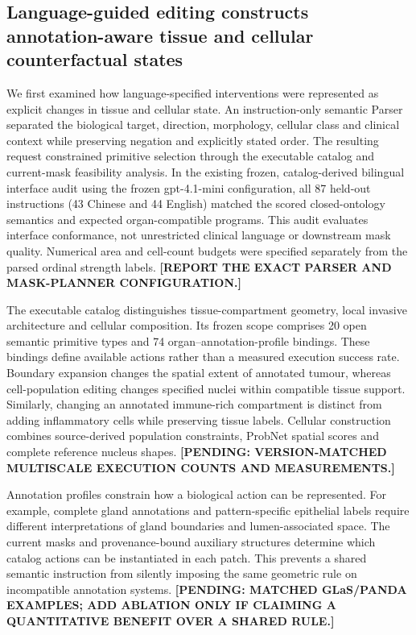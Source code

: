 \subsection{Language-guided editing constructs annotation-aware tissue and cellular counterfactual states}

We first examined how language-specified interventions were represented as
explicit changes in tissue and cellular state. An instruction-only semantic
Parser separated the biological target, direction, morphology, cellular class
and clinical context while preserving negation and explicitly stated order.
The resulting request constrained primitive selection through the executable
catalog and current-mask feasibility analysis. In the existing frozen,
catalog-derived bilingual interface audit using the frozen gpt-4.1-mini
configuration, all 87 held-out instructions
(43 Chinese and 44 English) matched the scored closed-ontology semantics and
expected organ-compatible programs. This audit evaluates interface conformance,
not unrestricted clinical language or downstream mask quality. Numerical area
and cell-count budgets were specified separately from the parsed ordinal
strength labels. \textbf{[REPORT THE EXACT PARSER AND MASK-PLANNER CONFIGURATION.]}

The executable catalog distinguishes tissue-compartment geometry, local
invasive architecture and cellular composition. Its frozen scope comprises
20 open semantic primitive types and 74 organ--annotation-profile bindings.
These bindings define available actions rather than a measured execution
success rate. Boundary expansion changes the spatial extent of annotated tumour,
whereas cell-population editing changes specified nuclei within compatible
tissue support. Similarly, changing an annotated immune-rich compartment is
distinct from adding inflammatory cells while preserving tissue labels.
Cellular construction combines source-derived population constraints,
ProbNet spatial scores and complete reference nucleus shapes.
\textbf{[PENDING: VERSION-MATCHED MULTISCALE EXECUTION COUNTS AND MEASUREMENTS.]}

Annotation profiles constrain how a biological action can be represented.
For example, complete gland annotations and pattern-specific epithelial labels
require different interpretations of gland boundaries and lumen-associated
space. The current masks and provenance-bound auxiliary structures determine
which catalog actions can be instantiated in each patch. This prevents a shared
semantic instruction from silently imposing the same geometric rule on
incompatible annotation systems.
\textbf{[PENDING: MATCHED GLaS/PANDA EXAMPLES; ADD ABLATION ONLY IF CLAIMING A
QUANTITATIVE BENEFIT OVER A SHARED RULE.]}

